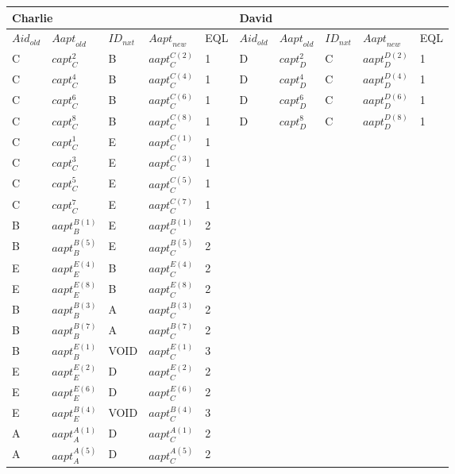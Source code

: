 \begin{tabular}{|p{0.4in}|p{0.5in}|p{0.3in}|p{0.5in}|p{0.3in}|p{0.4in}|p{0.4in}|p{0.3in}|p{0.5in}|p{0.3in}|} \hline 
\multicolumn{5}{|p{1in}|}{Charlie} & \multicolumn{5}{|p{1.8in}|}{David} \\ \hline 
${Aid}_{old}$ & ${Aapt}_{old}$ & ${ID}_{nxt}$ & ${Aapt}_{new}$ & EQL & ${Aid}_{old}$ & ${Aapt}_{old}$ & ${ID}_{nxt}$ & ${Aapt}_{new}$ & EQL \\ \hline 
C & ${capt}^2_C$ & B & ${aapt}^{C\left(2\right)}_C$ & 1 & D & ${capt}^2_D$ & C & ${aapt}^{D\left(2\right)}_D$ & 1 \\ \hline 
C & ${capt}^4_C$ & B & ${aapt}^{C\left(4\right)}_C$ & 1 & D & ${capt}^4_D$ & C & ${aapt}^{D\left(4\right)}_D$ & 1 \\ \hline 
C & ${capt}^6_C$ & B & ${aapt}^{C\left(6\right)}_C$ & 1 & D & ${capt}^6_D$ & C & ${aapt}^{D\left(6\right)}_D$ & 1 \\ \hline 
C & ${capt}^8_C$ & B & ${aapt}^{C\left(8\right)}_C$ & 1 & D & ${capt}^8_D$ & C & ${aapt}^{D\left(8\right)}_D$ & 1 \\ \hline 
C & ${capt}^1_C$ & E & ${aapt}^{C\left(1\right)}_C$ & 1 &  &  &  &  &  \\ \hline 
C & ${capt}^3_C$ & E & ${aapt}^{C\left(3\right)}_C$ & 1 &  &  &  &  &  \\ \hline 
C & ${capt}^5_C$ & E & ${aapt}^{C\left(5\right)}_C$ & 1 &  &  &  &  &  \\ \hline 
C & ${capt}^7_C$ & E & ${aapt}^{C\left(7\right)}_C$ & 1 &  &  &  &  &  \\ \hline 
B & ${aapt}^{B\left(1\right)}_B$ & E & ${aapt}^{B\left(1\right)}_C$ & 2 &  &  &  &  &  \\ \hline 
B & ${aapt}^{B\left(5\right)}_B$ & E & ${aapt}^{B\left(5\right)}_C$ & 2 &  &  &  &  &  \\ \hline 
E & ${aapt}^{E\left(4\right)}_E$ & B & ${aapt}^{E\left(4\right)}_C$ & 2 &  &  &  &  &  \\ \hline 
E & ${aapt}^{E\left(8\right)}_E$ & B & ${aapt}^{E\left(8\right)}_C$ & 2 &  &  &  &  &  \\ \hline 
B & ${aapt}^{B\left(3\right)}_B$ & A & ${aapt}^{B\left(3\right)}_C$ & 2 &  &  &  &  &  \\ \hline 
B & ${aapt}^{B\left(7\right)}_B$ & A & ${aapt}^{B\left(7\right)}_C$ & 2 &  &  &  &  &  \\ \hline 
B & ${aapt}^{E\left(1\right)}_B$ & VOID & ${aapt}^{E\left(1\right)}_C$ & 3 &  &  &  &  &  \\ \hline 
E & ${aapt}^{E\left(2\right)}_E$ & D & ${aapt}^{E\left(2\right)}_C$ & 2 &  &  &  &  &  \\ \hline 
E & ${aapt}^{E\left(6\right)}_E$ & D & ${aapt}^{E\left(6\right)}_C$ & 2 &  &  &  &  &  \\ \hline 
E & ${aapt}^{B\left(4\right)}_E$ & VOID & ${aapt}^{B\left(4\right)}_C$ & 3 &  &  &  &  &  \\ \hline 
A & ${aapt}^{A\left(1\right)}_A$ & D & ${aapt}^{A\left(1\right)}_C$ & 2 &  &  &  &  &  \\ \hline 
A & ${aapt}^{A\left(5\right)}_A$ & D & ${aapt}^{A\left(5\right)}_C$ & 2 &  &  &  &  &  \\ \hline 
\end{tabular}
